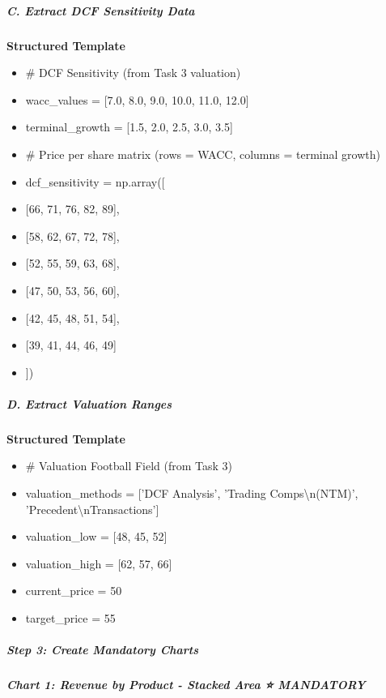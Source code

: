 \documentclass[11pt]{article}
\begin{document}
\subparagraph{C. Extract DCF Sensitivity Data}\mbox{}\par
\textbf{Structured Template}
\begin{itemize}[leftmargin=*,itemsep=2pt,topsep=2pt]
\item {} \# DCF Sensitivity (from Task 3 valuation)
\item {} wacc\_\allowbreak{}values = [7.0, 8.0, 9.0, 10.0, 11.0, 12.0]
\item {} terminal\_\allowbreak{}growth = [1.5, 2.0, 2.5, 3.0, 3.5]
\item {} \# Price per share matrix (rows = WACC, columns = terminal growth)
\item {} dcf\_\allowbreak{}sensitivity = np.array([
\item {} [66, 71, 76, 82, 89],
\item {} [58, 62, 67, 72, 78],
\item {} [52, 55, 59, 63, 68],
\item {} [47, 50, 53, 56, 60],
\item {} [42, 45, 48, 51, 54],
\item {} [39, 41, 44, 46, 49]
\item {} ])
\end{itemize}

\subparagraph{D. Extract Valuation Ranges}\mbox{}\par
\textbf{Structured Template}
\begin{itemize}[leftmargin=*,itemsep=2pt,topsep=2pt]
\item {} \# Valuation Football Field (from Task 3)
\item {} valuation\_\allowbreak{}methods = ['DCF Analysis', 'Trading Comps\textbackslash{}n(NTM)', 'Precedent\textbackslash{}nTransactions']
\item {} valuation\_\allowbreak{}low = [48, 45, 52]
\item {} valuation\_\allowbreak{}high = [62, 57, 66]
\item {} current\_\allowbreak{}price = 50
\item {} target\_\allowbreak{}price = 55
\end{itemize}

\subparagraph{Step 3: Create Mandatory Charts}\mbox{}\par

\subparagraph{Chart 1: Revenue by Product - Stacked Area ⭐ MANDATORY}\mbox{}\par
\end{document}
